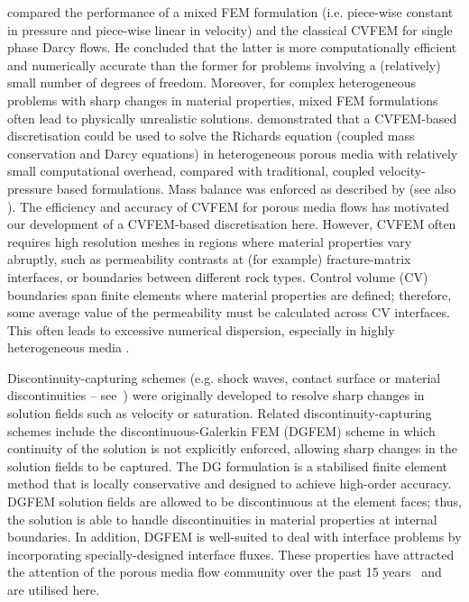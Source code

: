 \documentclass[times]{fldauth}
\begin{document}
\cite{durlofsky_1993,durlofsky_1994} compared the performance of a mixed FEM formulation (i.e. piece-wise constant in pressure and piece-wise linear in velocity) and the classical CVFEM for single phase Darcy flows. He concluded that the latter is more computationally efficient and numerically accurate than the former for problems involving a (relatively) small number of degrees of freedom. Moreover, for complex heterogeneous problems with sharp changes in material properties, mixed FEM formulations often lead to physically unrealistic solutions.  \cite{cumming_2011} demonstrated that a CVFEM-based discretisation could be used to solve the Richards equation (coupled mass conservation and Darcy equations) in heterogeneous porous media with relatively small computational overhead, compared with traditional, coupled velocity-pressure based formulations.  Mass balance was enforced as described by \cite{kirkland_1992} (see also \cite{forsyth_1990,cumming_phd2012}).  The efficiency and accuracy of CVFEM for porous media flows has motivated our development of a CVFEM-based discretisation here.  However, CVFEM often requires high resolution meshes in regions where material properties vary abruptly, such as permeability contrasts at (for example) fracture-matrix interfaces, or boundaries between different rock types. Control volume (CV) boundaries span finite elements where material properties are defined; therefore, some average value of the permeability must be calculated across CV interfaces. This often leads to excessive numerical dispersion, especially in highly heterogeneous media \cite{nick_2011b, nick_2011a}.

Discontinuity-capturing schemes (e.g. shock waves, contact surface or material discontinuities -- see~\cite{brooks_1982,tezduyar_1986}) were originally developed to resolve sharp changes in solution fields such as velocity or saturation. Related discontinuity-capturing schemes include the discontinuous-Galerkin FEM (DGFEM) scheme in which continuity of the solution is not explicitly enforced, allowing sharp changes in the solution fields to be captured. The DG formulation is a stabilised finite element method that is locally conservative and designed to achieve high-order accuracy. DGFEM solution fields are allowed to be discontinuous at the element faces; thus, the solution is able to handle discontinuities in material properties at internal boundaries. In addition, DGFEM is well-suited to deal with interface problems by incorporating specially-designed interface fluxes. These properties have attracted the attention of the porous media flow community over the past 15 years~\cite{riviere_2000,riviere_2002,bastian_2002} and are utilised here.
\end{document}
